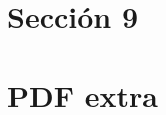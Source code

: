 \begin{ejercicio}[Libro 8.6]
\end{ejercicio}

\section{Sección 9}

\begin{ejercicio}[Libro 9.2]
\end{ejercicio}

\begin{ejercicio}[Libro 9.17]
\end{ejercicio}


\section{PDF extra}

